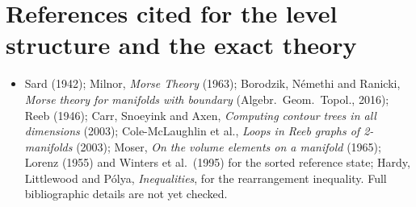 \documentclass[11pt]{article}
\theoremstyle{definition}
\theoremstyle{remark}
\begin{document}
\section*{References cited for the level structure and the exact theory}

\begin{itemize}\small
\item Sard (1942); Milnor, \emph{Morse Theory} (1963); Borodzik, N\'emethi
  and Ranicki, \emph{Morse theory for manifolds with boundary} (Algebr.\
  Geom.\ Topol., 2016); Reeb (1946); Carr, Snoeyink and Axen,
  \emph{Computing contour trees in all dimensions} (2003);
  Cole-McLaughlin et al., \emph{Loops in Reeb graphs of 2-manifolds}
  (2003); Moser, \emph{On the volume elements on a manifold} (1965);
  Lorenz (1955) and Winters et al.\ (1995) for the sorted reference
  state; Hardy, Littlewood and P\'olya, \emph{Inequalities}, for the
  rearrangement inequality. Full bibliographic details are not yet
  checked.
\end{itemize}
\end{document}
